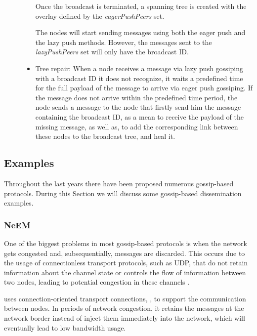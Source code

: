 \begin{description}
\begin{itemize}
                        Once the broadcast is terminated, a spanning tree is created with the
                        overlay defined by the \textit{eagerPushPeers} set.

                        The nodes will start sending messages using both the eager push and the
                        lazy push methods. However, the messages sent to the \textit{lazyPushPeers}
                        set will only have the broadcast ID.
                  \item Tree repair: When a node receives a message via lazy push gossiping
                        with a broadcast ID it does not recognize, it waits a predefined time
                        for the full payload of the message to arrive via eager push gossiping.
                        If the message does not arrive within the predefined time period, the
                        node sends a message to the node that firstly send him the message
                        containing the broadcast ID, as a mean to receive the payload of the
                        missing message, as well as, to add the corresponding link between
                        these nodes to the broadcast tree, and heal it.
            \end{itemize}
\end{description}


\subsection{Examples}
\label{subsec:gossip_examples}
Throughout the last years there have been proposed numerous gossip-based protocols. During
this Section we will discuss some gossip-based dissemination examples.

\subsubsection{\Gls{NeEM}}
\label{subsubsec:gossip_examples_neem}
One of the biggest problems in most gossip-based protocols is when the
network gets congested and, subsequentially, messages are discarded. This occurs due to
the usage of connectionless transport protocols, such as \Gls{UDP}, that do not retain
information about the channel state or controls the flow of information between two nodes,
leading to potential congestion in these channels \cite{Meister1985}.

 \cite{Pereira2003} uses connection-oriented transport connections,
, to support the communication between nodes. In periods of network congestion,
it retains the messages at the network border instead of inject them immediately into the
network, which will eventually lead to low bandwidth usage.

